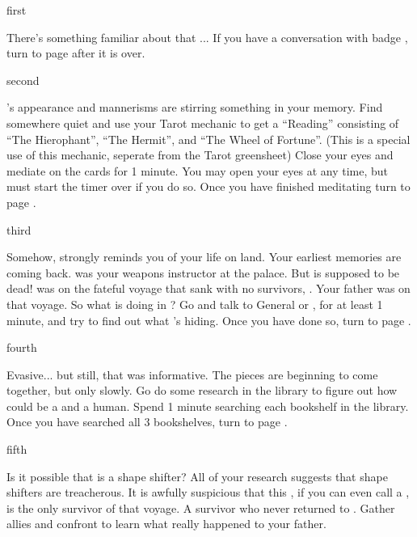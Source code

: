 \documentclass[greennotebook]{NeptuneBall}
\begin{document}

\startnotebook{\nShipwreck{}}

\begin{page}{first}

There's something familiar about that \cGeneral{\mer}... If you have a conversation with badge \cGeneral{\MYnumber}, turn to page  after it is over.

\end{page}

\begin{page}{second}

\cGeneral{}'s appearance and mannerisms are stirring something in your memory. Find somewhere quiet and use your Tarot mechanic to get a ``Reading'' consisting of ``The Hierophant'', ``The Hermit'', and ``The Wheel of Fortune''. (This is a special use of this mechanic, seperate from the Tarot greensheet) Close your eyes and mediate on the cards for 1 minute. You may open your eyes at any time, but must start the timer over if you do so. Once you have finished meditating turn to page .

\end{page}

\begin{page}{third}

Somehow, \cGeneral{} strongly reminds you of your life on land. Your earliest memories are coming back. \cGeneral{} was your weapons instructor at the palace. But \cGeneral{\they} is supposed to be dead! \cGeneral{} was on the fateful voyage that sank with no survivors, \cKraken{\MYname}. Your father was on that voyage. So what is \cGeneral{} doing in \pAtlantis{}? Go and talk to General \cGeneral{} or \cGeneral{\their} \cQueen{\spouse}, \cQueen{} for at least 1 minute, and try to find out what \cGeneral{\they}'s hiding. Once you have done so, turn to page .

\end{page}

\begin{page}{fourth}

Evasive... but still, that was informative. The pieces are beginning to come together, but only slowly. Go do some research in the library to figure out how \cGeneral{} could be a \cGeneral{\mer} and a human. Spend 1 minute searching each bookshelf in the library. Once you have searched all 3 bookshelves, turn to page .

\end{page}

\begin{page}{fifth}

Is it possible that \cGeneral{} is a shape shifter? All of your research suggests that shape shifters are treacherous. It is awfully suspicious that this \cGeneral{\human}, if you can even call \cGeneral{\them} a \cGeneral{\human}, is the only survivor of that voyage. A survivor who never returned to \pAmerica{}. Gather allies and confront \cGeneral{\them} to learn what really happened to your father.

\end{page}

\endnotebook
\end{document}
